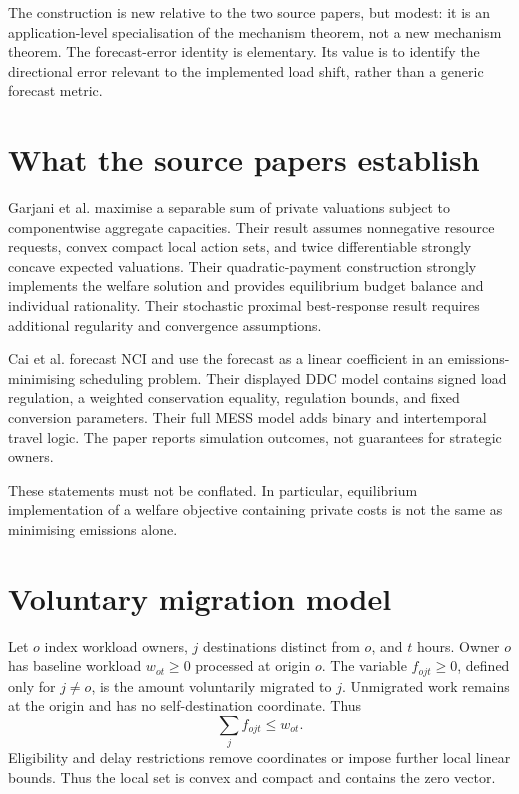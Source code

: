 \documentclass{article}
\begin{document}
The construction is new relative to the two source papers, but modest: it is an application-level specialisation of the mechanism theorem, not a new mechanism theorem. The forecast-error identity is elementary. Its value is to identify the directional error relevant to the implemented load shift, rather than a generic forecast metric.

\section{What the source papers establish}

Garjani et al. maximise a separable sum of private valuations subject to componentwise aggregate capacities. Their result assumes nonnegative resource requests, convex compact local action sets, and twice differentiable strongly concave expected valuations. Their quadratic-payment construction strongly implements the welfare solution and provides equilibrium budget balance and individual rationality. Their stochastic proximal best-response result requires additional regularity and convergence assumptions.

Cai et al. forecast NCI and use the forecast as a linear coefficient in an emissions-minimising scheduling problem. Their displayed DDC model contains signed load regulation, a weighted conservation equality, regulation bounds, and fixed conversion parameters. Their full MESS model adds binary and intertemporal travel logic. The paper reports simulation outcomes, not guarantees for strategic owners.

These statements must not be conflated. In particular, equilibrium implementation of a welfare objective containing private costs is not the same as minimising emissions alone.

\section{Voluntary migration model}

Let $o$ index workload owners, $j$ destinations distinct from $o$, and $t$ hours. Owner $o$ has baseline workload $w_{ot}\geq 0$ processed at origin $o$. The variable $f_{ojt}\geq0$, defined only for $j\ne o$, is the amount voluntarily migrated to $j$. Unmigrated work remains at the origin and has no self-destination coordinate. Thus
\begin{equation}
  \sum_j f_{ojt}\leq w_{ot}.
  \label{eq:availability}
\end{equation}
Eligibility and delay restrictions remove coordinates or impose further local linear bounds. Thus the local set is convex and compact and contains the zero vector.
\end{document}
